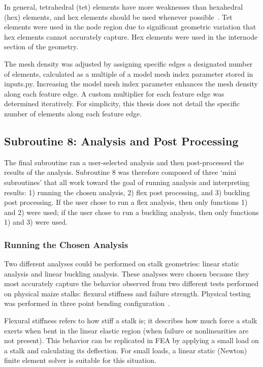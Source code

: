 In general, tetrahedral (tet) elements have more weaknesses than hexahedral (hex) elements, and hex elements should be used whenever possible~. Tet elements were used in the node region due to significant geometric variation that hex elements cannot accurately capture. Hex elements were used in the internode section of the geometry.

The mesh density was adjusted by assigning specific edges a designated number of elements, calculated as a multiple of a model mesh index parameter stored in inputs.py. Increasing the model mesh index parameter enhances the mesh density along each feature edge. A custom multiplier for each feature edge was determined iteratively. For simplicity, this thesis does not detail the specific number of elements along each feature edge.

\subsection{Subroutine 8: Analysis and Post Processing}
\label{ssec:subroutine_8_analysis_and_post_processing}
The final subroutine ran a user-selected analysis and then post-processed the results of the analysis. Subroutine 8 was therefore composed of three ‘mini subroutines’ that all work toward the goal of running analysis and interpreting results: 1) running the chosen analysis, 2) flex post processing, and 3) buckling post processing. If the user chose to run a flex analysis, then only functions 1) and 2) were used; if the user chose to run a buckling analysis, then only functions 1) and 3) were used. 

\subsubsection{Running the Chosen Analysis}
\label{sssec:running_the_chosen_analysis}
Two different analyses could be performed on stalk geometries: linear static analysis and linear buckling analysis. These analyses were chosen because they most accurately capture the behavior observed from two different tests performed on physical maize stalks: flexural stiffness and failure strength. Physical testing was performed in three point bending configuration~.

Flexural stiffness refers to how stiff a stalk is; it describes how much force a stalk exerts when bent in the linear elastic region (when failure or nonlinearities are not present). This behavior can be replicated in FEA by applying a small load on a stalk and calculating its deflection. For small loads, a linear static (Newton) finite element solver is suitable for this situation.

